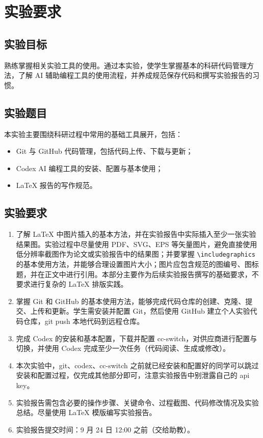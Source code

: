\documentclass{SYSUReport}
\date{2026 年 9 月 10 日}
\begin{document}
\cover
\thispagestyle{empty} %
\clearpage


\tableofcontents
\clearpage


\section{实验要求}

\subsection{实验目标}

熟练掌握相关实验工具的使用。通过本实验，使学生掌握基本的科研代码管理方法，了解 AI 辅助编程工具的使用流程，并养成规范保存代码和撰写实验报告的习惯。

\subsection{实验题目}

本实验主要围绕科研过程中常用的基础工具展开，包括：

\begin{itemize}
    \item Git 与 GitHub 代码管理，包括代码上传、下载与更新；
    \item Codex AI 编程工具的安装、配置与基本使用；
    \item LaTeX 报告的写作规范。
\end{itemize}

\subsection{实验要求}

\begin{enumerate}
    \item 了解 LaTeX 中图片插入的基本方法，并在实验报告中实际插入至少一张实验结果图。实验过程中尽量使用 PDF、SVG、EPS 等矢量图片，避免直接使用低分辨率截图作为论文或实验报告中的结果图；并要掌握 \verb|\includegraphics| 的基本使用方法，并能够合理设置图片大小；图片应包含规范的图编号、图标题，并在正文中进行引用。本部分主要作为后续实验报告撰写的基础要求，不要求进行复杂的 LaTeX 排版实践。
    \item 掌握 Git 和 GitHub 的基本使用方法，能够完成代码仓库的创建、克隆、提交、上传和更新。学生需安装并配置 Git，然后使用 GitHub 建立个人实验代码仓库，git push 本地代码到远程仓库。
    \item 完成 Codex 的安装和基本配置，下载并配置 cc-switch，对供应商进行配置与切换，并使用 Codex 完成至少一次任务（代码阅读、生成或修改）。
    \item 本次实验中，git、codex、cc-switch 之前就已经安装和配置好的同学可以跳过安装和配置过程，仅完成其他部分即可，注意实验报告中别泄露自己的 api key。
    \item 实验报告需包含必要的操作步骤、关键命令、过程截图、代码修改情况及实验总结。尽量使用 LaTeX 模版编写实验报告。
    \item 实验报告提交时间：9 月 24 日 12:00 之前（交给助教）。
\end{enumerate}
\end{document}
